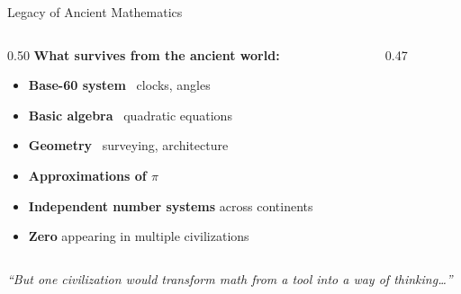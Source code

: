 \begin{frame}{Legacy of Ancient Mathematics}

  \begin{columns}[T]
    \begin{column}{0.50\textwidth}
      \textbf{What survives from the ancient world:}
      \begin{itemize}
        \item \textbf{Base-60 system} \textrightarrow\ clocks, angles
        \item \textbf{Basic algebra} \textrightarrow\ quadratic equations
        \item \textbf{Geometry} \textrightarrow\ surveying, architecture
        \item \textbf{Approximations of $\pi$}
        \item \textbf{Independent number systems} across continents
        \item \textbf{Zero} appearing in multiple civilizations
      \end{itemize}
    \end{column}

    \begin{column}{0.47\textwidth}
    \end{column}
  \end{columns}

  \vspace{0.5em}
  \begin{center}
    \textcolor{greekBlue}{\emph{``But one civilization would transform math from a tool
    into a way of thinking\ldots''}}
  \end{center}

\end{frame}
